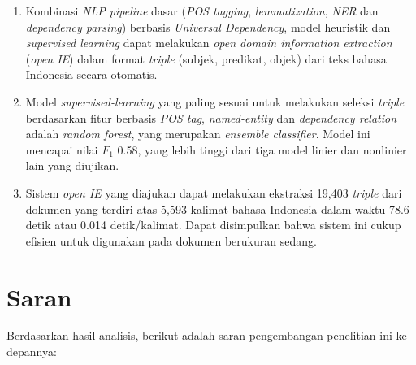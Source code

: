 \begin{enumerate}
	\item Kombinasi \textit{NLP pipeline} dasar (\textit{POS tagging}, \textit{lemmatization}, \textit{NER} dan \textit{dependency parsing}) berbasis \textit{Universal Dependency}, model heuristik dan \textit{supervised learning} dapat melakukan \textit{open domain information extraction} (\textit{open IE}) dalam format \textit{triple} (subjek, predikat, objek) dari teks bahasa Indonesia secara otomatis.
	
	\item Model \textit{supervised-learning} yang paling sesuai untuk melakukan seleksi \textit{triple} berdasarkan fitur berbasis \textit{POS tag}, \textit{named-entity} dan \textit{dependency relation} adalah \textit{random forest}, yang merupakan \textit{ensemble classifier}. Model ini mencapai nilai $F_1$ 0.58, yang lebih tinggi dari tiga model linier dan nonlinier lain yang diujikan.
	
	\item Sistem \textit{open IE} yang diajukan dapat melakukan ekstraksi 19,403 \textit{triple} dari dokumen yang terdiri atas 5,593 kalimat bahasa Indonesia dalam waktu 78.6 detik atau 0.014 detik/kalimat. Dapat disimpulkan bahwa sistem ini cukup efisien untuk digunakan pada dokumen berukuran sedang.
\end{enumerate}


\section{Saran}


Berdasarkan hasil analisis, berikut adalah saran pengembangan penelitian ini ke depannya:

